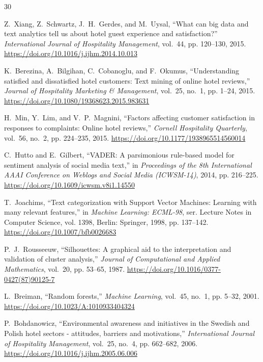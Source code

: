\documentclass[11pt,a4paper]{article}
\begin{document}

\begin{thebibliography}{30}

Z.~Xiang, Z.~Schwartz, J.~H.~Gerdes, and M.~Uysal, ``What can big data and text analytics tell us about hotel guest experience and satisfaction?'' \emph{International Journal of Hospitality Management}, vol.~44, pp. 120--130, 2015. \url{https://doi.org/10.1016/j.ijhm.2014.10.013}

K.~Berezina, A.~Bilgihan, C.~Cobanoglu, and F.~Okumus, ``Understanding satisfied and dissatisfied hotel customers: Text mining of online hotel reviews,'' \emph{Journal of Hospitality Marketing \& Management}, vol.~25, no.~1, pp. 1--24, 2015. \url{https://doi.org/10.1080/19368623.2015.983631}

H.~Min, Y.~Lim, and V.~P.~Magnini, ``Factors affecting customer satisfaction in responses to complaints: Online hotel reviews,'' \emph{Cornell Hospitality Quarterly}, vol.~56, no.~2, pp. 224--235, 2015. \url{https://doi.org/10.1177/1938965514560014}

C.~Hutto and E.~Gilbert, ``VADER: A parsimonious rule-based model for sentiment analysis of social media text,'' in \emph{Proceedings of the 8th International AAAI Conference on Weblogs and Social Media (ICWSM-14)}, 2014, pp. 216--225. \url{https://doi.org/10.1609/icwsm.v8i1.14550}

T.~Joachims, ``Text categorization with Support Vector Machines: Learning with many relevant features,'' in \emph{Machine Learning: ECML-98}, ser. Lecture Notes in Computer Science, vol. 1398, Berlin: Springer, 1998, pp. 137--142. \url{https://doi.org/10.1007/bfb0026683}

P.~J.~Rousseeuw, ``Silhouettes: A graphical aid to the interpretation and validation of cluster analysis,'' \emph{Journal of Computational and Applied Mathematics}, vol.~20, pp. 53--65, 1987. \url{https://doi.org/10.1016/0377-0427(87)90125-7}

L.~Breiman, ``Random forests,'' \emph{Machine Learning}, vol.~45, no.~1, pp. 5--32, 2001. \url{https://doi.org/10.1023/A:1010933404324}

P.~Bohdanowicz, ``Environmental awareness and initiatives in the Swedish and Polish hotel sectors - attitudes, barriers and motivations,'' \emph{International Journal of Hospitality Management}, vol.~25, no.~4, pp. 662--682, 2006. \url{https://doi.org/10.1016/j.ijhm.2005.06.006}


\end{thebibliography}
\end{document}
